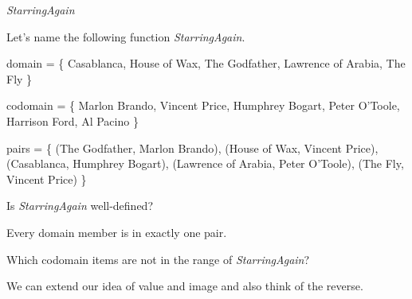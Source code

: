 \documentclass{ximera}
\begin{document}
\begin{example} \textit{StarringAgain}

Let's name the following function \textit{StarringAgain}.

domain = \{ Casablanca, House of Wax,  The Godfather, Lawrence of Arabia, The Fly \}

codomain = \{ Marlon Brando, Vincent Price, Humphrey Bogart, Peter O'Toole, Harrison Ford, Al Pacino \}

pairs = \{ (The Godfather, Marlon Brando), (House of Wax, Vincent Price), (Casablanca, Humphrey Bogart), (Lawrence of Arabia, Peter O'Toole), (The Fly, Vincent Price) \} 





\begin{question}

Is \textit{StarringAgain} well-defined?

\begin{multipleChoice}
\end{multipleChoice}
\begin{feedback}
Every domain member is in exactly one pair.
\end{feedback}

\end{question}







\begin{question}

Which codomain items are not in the range of \textit{StarringAgain}?

\begin{selectAll}
\end{selectAll}

\end{question}





\end{example}







We can extend our idea of value and image and also think of the reverse. \\
\end{document}
